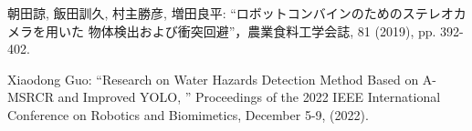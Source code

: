 \documentclass[10pt]{jarticle}
\begin{document}
 
    \vspace{5truemm}
    {\footnotesize
        \begin{thebibliography}{99}

            朝田諒, 飯田訓久, 村主勝彦, 増田良平: ``ロボットコンバインのためのステレオカメラを用いた
            物体検出および衝突回避''，農業食料工学会誌, 81 (2019), pp. 392-402.

            Xiaodong Guo: ``Research on Water Hazards Detection Method Based on A-MSRCR and Improved YOLO, ''
            Proceedings of the 2022 IEEE International Conference on Robotics and Biomimetics, 
            December 5-9, (2022). 

            
            
        \end{thebibliography}
    }
    \normalsize
\end{document}
